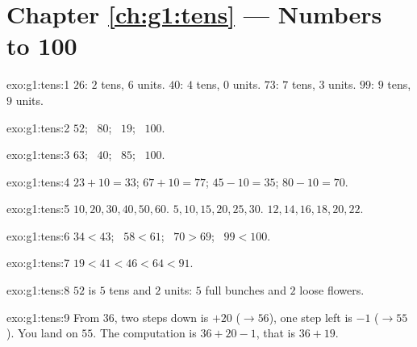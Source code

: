 \section*{Chapter \ref{ch:g1:tens} --- Numbers to 100}

\begin{solution}{exo:g1:tens:1}
$26$: $2$ tens, $6$ units. $40$: $4$ tens, $0$ units. $73$: $7$
tens, $3$ units. $99$: $9$ tens, $9$ units.
\end{solution}

\begin{solution}{exo:g1:tens:2}
$52$; \ $80$; \ $19$; \ $100$.
\end{solution}

\begin{solution}{exo:g1:tens:3}
$63$; \ $40$; \ $85$; \ $100$.
\end{solution}

\begin{solution}{exo:g1:tens:4}
$23 + 10 = 33$; \quad $67 + 10 = 77$; \quad $45 - 10 = 35$; \quad
$80 - 10 = 70$.
\end{solution}

\begin{solution}{exo:g1:tens:5}
$10, 20, 30, 40, 50, 60$. \quad $5, 10, 15, 20, 25, 30$. \quad
$12, 14, 16, 18, 20, 22$.
\end{solution}

\begin{solution}{exo:g1:tens:6}
$34 < 43$; \ $58 < 61$; \ $70 > 69$; \ $99 < 100$.
\end{solution}

\begin{solution}{exo:g1:tens:7}
$19 < 41 < 46 < 64 < 91$.
\end{solution}

\begin{solution}{exo:g1:tens:8}
$52$ is $5$ tens and $2$ units: $5$ full bunches and $2$ loose
flowers.
\end{solution}

\begin{solution}{exo:g1:tens:9}
From $36$, two steps down is $+20$ ($\to 56$), one step left is
$-1$ ($\to 55$). You land on $55$. The computation is
$36 + 20 - 1$, that is $36 + 19$.
\end{solution}
